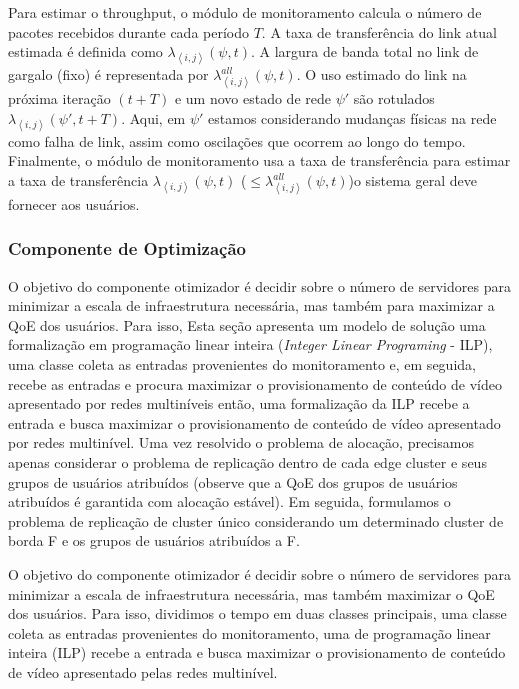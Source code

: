 Para estimar o throughput, o módulo de monitoramento calcula o número de pacotes recebidos durante cada período $T$. A taxa de transferência do link atual estimada é definida como $\lambda_{\left \langle i,j \right \rangle}(\psi, t)$. A largura de banda total no link de gargalo (fixo) é representada por $\lambda^{all}_{\left \langle i,j \right \rangle}(\psi, t)$. O uso estimado do link na próxima iteração $(t+T)$ e um novo estado de rede $\psi'$ são rotulados $\lambda_{\left \langle i,j \right \rangle}(\psi', t+ T) $. Aqui, em $\psi'$ estamos considerando mudanças físicas na rede como falha de link, assim como oscilações que ocorrem ao longo do tempo.%
Finalmente, o módulo de monitoramento usa a taxa de transferência para estimar a taxa de transferência $\lambda_{\left \langle i,j \right \rangle}(\psi, t)$ ($\leqslant \lambda^{all}_{\left \langle i,j \right \rangle}(\psi, t)$)o sistema geral deve fornecer aos usuários.


\subsubsection*{Componente de Optimização}

O objetivo do componente otimizador é decidir sobre o número de servidores para minimizar a escala de infraestrutura necessária, mas também para maximizar a QoE dos usuários. Para isso, Esta seção apresenta um modelo de solução uma formalização em programação linear inteira (\textit{Integer Linear Programing} - ILP), uma classe coleta as entradas provenientes do monitoramento e, em seguida, recebe as entradas e procura maximizar o provisionamento de conteúdo de vídeo apresentado por redes multiníveis então, uma formalização da ILP recebe a entrada e busca maximizar o provisionamento de conteúdo de vídeo apresentado por redes multinível. 
Uma vez resolvido o problema de alocação, precisamos apenas considerar o problema de replicação dentro de cada edge cluster e seus grupos de usuários atribuídos (observe que a QoE dos grupos de usuários atribuídos é garantida com alocação estável). Em seguida, formulamos o problema de replicação de cluster único considerando um determinado cluster de borda F e os grupos de usuários atribuídos a F.

O objetivo do componente otimizador é decidir sobre o número de servidores para minimizar a escala de infraestrutura necessária, mas também maximizar o QoE dos usuários. Para isso, dividimos o tempo em duas classes principais, uma classe coleta as entradas provenientes do monitoramento, uma de programação linear inteira (ILP) recebe a entrada e busca maximizar o provisionamento de conteúdo de vídeo apresentado pelas redes multinível. %

